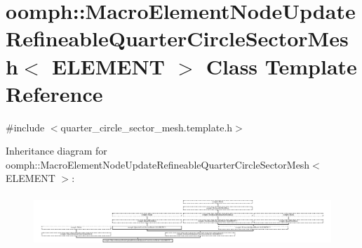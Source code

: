 \hypertarget{classoomph_1_1MacroElementNodeUpdateRefineableQuarterCircleSectorMesh}{}\section{oomph\+:\+:Macro\+Element\+Node\+Update\+Refineable\+Quarter\+Circle\+Sector\+Mesh$<$ E\+L\+E\+M\+E\+NT $>$ Class Template Reference}
\label{classoomph_1_1MacroElementNodeUpdateRefineableQuarterCircleSectorMesh}


{\ttfamily \#include $<$quarter\+\_\+circle\+\_\+sector\+\_\+mesh.\+template.\+h$>$}

Inheritance diagram for oomph\+:\+:Macro\+Element\+Node\+Update\+Refineable\+Quarter\+Circle\+Sector\+Mesh$<$ E\+L\+E\+M\+E\+NT $>$\+:\begin{figure}[H]
\begin{center}
\leavevmode
\includegraphics[height=1.956088cm]{classoomph_1_1MacroElementNodeUpdateRefineableQuarterCircleSectorMesh}
\end{center}
\end{figure}
